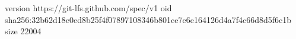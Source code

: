 version https://git-lfs.github.com/spec/v1
oid sha256:32b62d18e0ed8b25f4f07897108346b801ce7e6e164126d4a7f4c66d8d5f6c1b
size 22004
